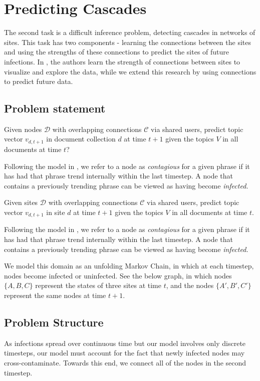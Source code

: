 \documentclass{article} %
\begin{document}
\section{Predicting Cascades}

The second task is a difficult inference problem, detecting cascades in networks of sites. This task has two components - learning the connections between the sites and using the strengths of these connections to predict the sites of future infections. In \cite{netinf}, the authors learn the strength of connections between sites to visualize and explore the data, while we extend this research by using connections to predict future data.


\subsection{Problem statement}
Given nodes $\mathcal{D}$ with overlapping connections $\mathcal{C}$ via shared users, predict topic vector $v_{d,t+1}$ in document collection $d$ at time $t+1$ given the topics $V$ in all documents at time $t$?


Following the model in \cite{influential}, we refer to a node as \textit{contagious} for a given phrase if it has had that phrase trend internally within the last timestep. A node that contains a previously trending phrase can be viewed as having become \textit{infected.} 

Given sites $\mathcal{D}$ with overlapping connections $\mathcal{C}$ via shared users, predict topic vector $v_{d,t+1}$ in site $d$ at time $t+1$ given the topics $V$ in all documents at time $t$.

Following the model in \cite{influential}, we refer to a node as \textit{contagious} for a given phrase if it has had that phrase trend internally within the last timestep. A node that contains a previously trending phrase can be viewed as having become \textit{infected.} 

We model this domain as an unfolding Markov Chain, in which at each timestep, nodes become infected or uninfected. See the below graph, in which nodes $\{A,B,C\}$ represent the states of three sites at time $t$, and the nodes $\{A',B',C'\}$ represent the same nodes at time $t+1$.

\subsection{Problem Structure}

As infections spread over continuous time but our model involves only discrete timesteps, our model must account for the fact that newly infected nodes may cross-contaminate. Towards this end, we connect all of the nodes in the second timestep.
\end{document}

